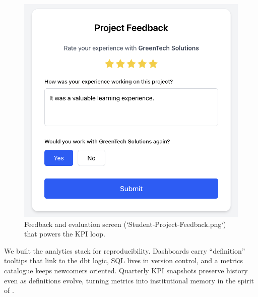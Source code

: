 \begin{figure}[h]
  \centering
  \includegraphics[width=0.8\linewidth]{figures/Student-Project-Feedback.png}
  \caption{Feedback and evaluation screen (`Student-Project-Feedback.png`) that powers the KPI loop.}
  \label{fig:feedback-screen}
\end{figure}

We built the analytics stack for reproducibility. Dashboards carry ``definition'' tooltips that link to the dbt logic, SQL lives in version control, and a metrics catalogue keeps newcomers oriented. Quarterly KPI snapshots preserve history even as definitions evolve, turning metrics into institutional memory in the spirit of \citet{Choudary2016}.
